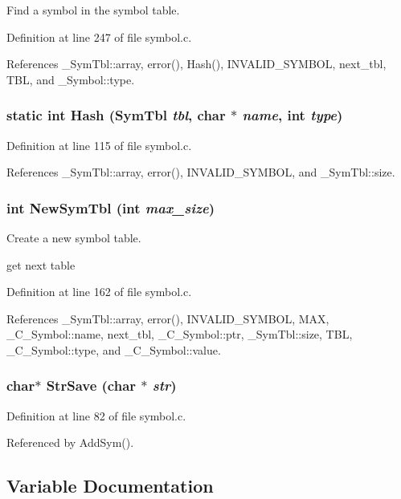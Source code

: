 Find a symbol in the symbol table. 

Definition at line 247 of file symbol.c.

References \_\-Sym\-Tbl::array, error(), Hash(), INVALID\_\-SYMBOL, next\_\-tbl, TBL, and \_\-Symbol::type.
\subsubsection{\setlength{\rightskip}{0pt plus 5cm}static int Hash (\bf{Sym\-Tbl} {\em tbl}, char $\ast$ {\em name}, int {\em type})\hspace{0.3cm}{\tt  [static]}}\label{symbol_8c_f23f72add718993c493def7c6557e32e}




Definition at line 115 of file symbol.c.

References \_\-Sym\-Tbl::array, error(), INVALID\_\-SYMBOL, and \_\-Sym\-Tbl::size.
\subsubsection{\setlength{\rightskip}{0pt plus 5cm}int New\-Sym\-Tbl (int {\em max\_\-size})}\label{symbol_8c_b7f269b7f4db6db301dfd0b6a3e68bef}


Create a new symbol table. 

get next table 

Definition at line 162 of file symbol.c.

References \_\-Sym\-Tbl::array, error(), INVALID\_\-SYMBOL, MAX, \_\-C\_\-Symbol::name, next\_\-tbl, \_\-C\_\-Symbol::ptr, \_\-Sym\-Tbl::size, TBL, \_\-C\_\-Symbol::type, and \_\-C\_\-Symbol::value.
\subsubsection{\setlength{\rightskip}{0pt plus 5cm}char$\ast$ Str\-Save (char $\ast$ {\em str})}\label{symbol_8c_2833fbeb3ea9ff23f6bf38a3ae4cb00e}




Definition at line 82 of file symbol.c.

Referenced by Add\-Sym().

\subsection{Variable Documentation}
